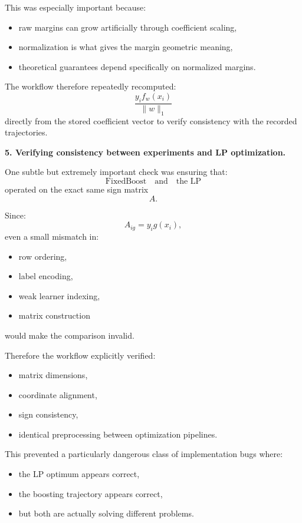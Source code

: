 \documentclass[11pt]{article}
\begin{document}
\begin{enumerate}
\begin{solutionbox}
This was especially important because:
\begin{itemize}
    \item raw margins can grow artificially through coefficient scaling,
    \item normalization is what gives the margin geometric meaning,
    \item theoretical guarantees depend specifically on normalized margins.
\end{itemize}

The workflow therefore repeatedly recomputed:
\[
\frac{
y_if_w(x_i)
}{
\|w\|_1
}
\]
directly from the stored coefficient vector to verify consistency with the recorded trajectories.

\medskip

\textbf{5. Verifying consistency between experiments and LP optimization.}

One subtle but extremely important check was ensuring that:
\[
\text{FixedBoost}
\quad\text{and}\quad
\text{the LP}
\]
operated on the exact same sign matrix
\[
A.
\]

Since:
\[
A_{ig}=y_ig(x_i),
\]
even a small mismatch in:
\begin{itemize}
    \item row ordering,
    \item label encoding,
    \item weak learner indexing,
    \item matrix construction
\end{itemize}
would make the comparison invalid.

Therefore the workflow explicitly verified:
\begin{itemize}
    \item matrix dimensions,
    \item coordinate alignment,
    \item sign consistency,
    \item identical preprocessing between optimization pipelines.
\end{itemize}

This prevented a particularly dangerous class of implementation bugs where:
\begin{itemize}
    \item the LP optimum appears correct,
    \item the boosting trajectory appears correct,
    \item but both are actually solving different problems.
\end{itemize}


\end{solutionbox}
\end{enumerate}
\end{document}
